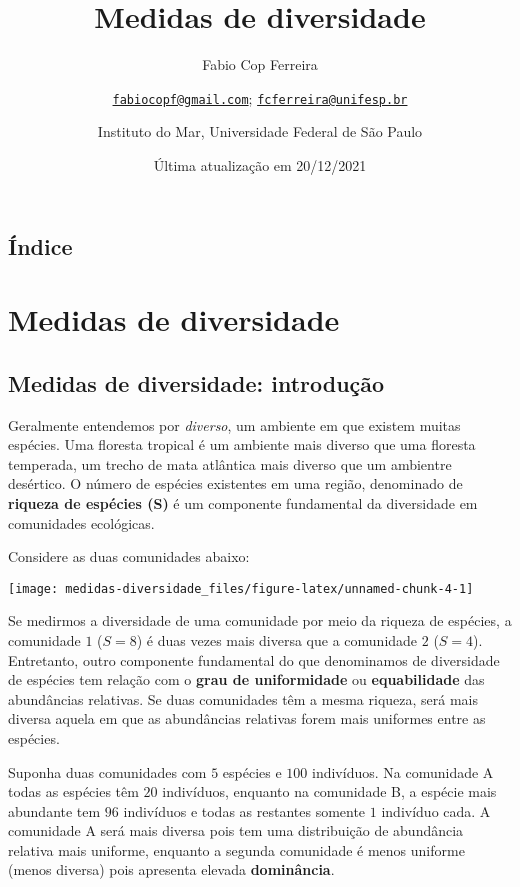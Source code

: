 \documentclass[
]{book}
\title{Medidas de diversidade}
\author{Fabio Cop Ferreira \and \href{mailto:fabiocopf@gmail.com}{\nolinkurl{fabiocopf@gmail.com}}; \href{mailto:fcferreira@unifesp.br}{\nolinkurl{fcferreira@unifesp.br}} \and Instituto do Mar, Universidade Federal de São Paulo}
\date{Última atualização em 20/12/2021}
\begin{document}
\maketitle

{
\setcounter{tocdepth}{1}
\tableofcontents
}
\hypertarget{uxedndice}{%
\chapter*{Índice}\label{uxedndice}}

\hypertarget{part-medidas-de-diversidade}{%
\part{Medidas de diversidade}\label{part-medidas-de-diversidade}}

\hypertarget{introdiversidade}{%
\chapter{Medidas de diversidade: introdução}\label{introdiversidade}}

Geralmente entendemos por \emph{diverso}, um ambiente em que existem muitas espécies. Uma floresta tropical é um ambiente mais diverso que uma floresta temperada, um trecho de mata atlântica mais diverso que um ambientre desértico. O número de espécies existentes em uma região, denominado de \textbf{riqueza de espécies (S)} é um componente fundamental da diversidade em comunidades ecológicas.

Considere as duas comunidades abaixo:

\begin{center}\texttt{[image: medidas-diversidade\_files/figure-latex/unnamed-chunk-4-1]} \end{center}

Se medirmos a diversidade de uma comunidade por meio da riqueza de espécies, a comunidade \(1\) (\(S = 8\)) é duas vezes mais diversa que a comunidade \(2\) (\(S = 4\)). Entretanto, outro componente fundamental do que denominamos de diversidade de espécies tem relação com o \textbf{grau de uniformidade} ou \textbf{equabilidade} das abundâncias relativas. Se duas comunidades têm a mesma riqueza, será mais diversa aquela em que as abundâncias relativas forem mais uniformes entre as espécies.

Suponha duas comunidades com \(5\) espécies e \(100\) indivíduos. Na comunidade A todas as espécies têm \(20\) indivíduos, enquanto na comunidade B, a espécie mais abundante tem \(96\) indivíduos e todas as restantes somente \(1\) indivíduo cada. A comunidade A será mais diversa pois tem uma distribuição de abundância relativa mais uniforme, enquanto a segunda comunidade é menos uniforme (menos diversa) pois apresenta elevada \textbf{dominância}.
\end{document}
